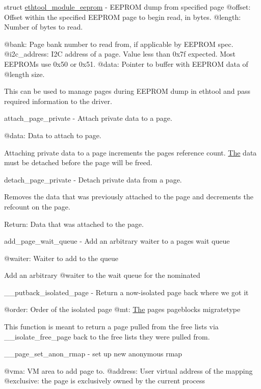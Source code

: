 struct \mbox{\hyperlink{structethtool__module__eeprom}{ethtool\+\_\+module\+\_\+eeprom}} -\/ E\+E\+P\+R\+OM dump from specified page @offset\+: Offset within the specified E\+E\+P\+R\+OM page to begin read, in bytes. @length\+: Number of bytes to read.

@bank\+: Page bank number to read from, if applicable by E\+E\+P\+R\+OM spec. @i2c\+\_\+address\+: I2C address of a page. Value less than 0x7f expected. Most E\+E\+P\+R\+O\+Ms use 0x50 or 0x51. @data\+: Pointer to buffer with E\+E\+P\+R\+OM data of @length size.

This can be used to manage pages during E\+E\+P\+R\+OM dump in ethtool and pass required information to the driver.

attach\+\_\+page\+\_\+private -\/ Attach private data to a page.

@data\+: Data to attach to page.

Attaching private data to a page increments the page\textquotesingle{}s reference count. \mbox{\hyperlink{classThe}{The}} data must be detached before the page will be freed.

detach\+\_\+page\+\_\+private -\/ Detach private data from a page.

Removes the data that was previously attached to the page and decrements the refcount on the page.

Return\+: Data that was attached to the page.

add\+\_\+page\+\_\+wait\+\_\+queue -\/ Add an arbitrary waiter to a page\textquotesingle{}s wait queue

@waiter\+: Waiter to add to the queue

Add an arbitrary @waiter to the wait queue for the nominated

\+\_\+\+\_\+putback\+\_\+isolated\+\_\+page -\/ Return a now-\/isolated page back where we got it

@order\+: Order of the isolated page @mt\+: \mbox{\hyperlink{classThe}{The}} page\textquotesingle{}s pageblock\textquotesingle{}s migratetype

This function is meant to return a page pulled from the free lists via \+\_\+\+\_\+isolate\+\_\+free\+\_\+page back to the free lists they were pulled from.

\+\_\+\+\_\+page\+\_\+set\+\_\+anon\+\_\+rmap -\/ set up new anonymous rmap

@vma\+: VM area to add page to. @address\+: User virtual address of the mapping @exclusive\+: the page is exclusively owned by the current process 